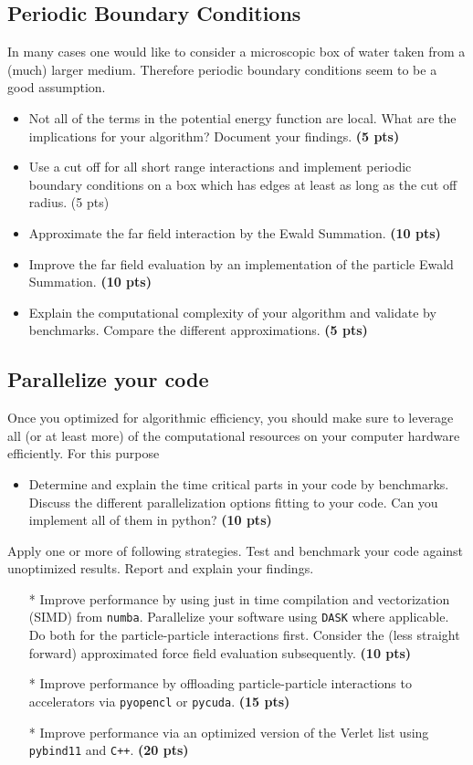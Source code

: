 \documentclass[a4paper,11pt]{amsart}
\begin{document}
\subsection{Periodic Boundary Conditions}
In many cases one would like to consider a microscopic box of water taken 
from a (much) larger medium. 
Therefore periodic boundary conditions seem to be a good assumption.
\begin{itemize}
  \item Not all of the terms in the potential energy function are local. 
  What are the implications for your algorithm? Document your findings. \textbf{(5 pts)}
  \item Use a cut off for all short range interactions and implement periodic 
  boundary conditions on a box which has edges at least as long as the cut off 
  radius. (5 pts)
  \item Approximate the far field interaction by the Ewald Summation. 
  \textbf{(10 pts)}
  \item Improve the far field evaluation by an implementation of the particle Ewald Summation. \textbf{(10 pts)}
  \item Explain the computational complexity of your algorithm and validate by 
  benchmarks. Compare the different approximations. \textbf{(5 pts)}
\end{itemize}
\subsection{Parallelize your code}
  Once you optimized for algorithmic efficiency, you should make sure to leverage 
  all (or at least more) of the computational resources on your computer hardware efficiently. 
  For this purpose
  \begin{itemize}
    \item Determine and explain the time critical parts in your code by benchmarks. 
    Discuss the different parallelization options fitting to your code. Can you implement all of them in python? \textbf{(10 pts)}
  \end{itemize}
  Apply one or more of following strategies. Test and benchmark your code against unoptimized results. Report and explain your findings.
  \begin{itemize}
      \item[*] Improve performance by using just in time compilation and vectorization (SIMD) from \texttt{numba}.
      Parallelize your software using \texttt{DASK} where applicable. 
      Do both for the particle-particle interactions first. Consider the (less straight forward) approximated force field evaluation subsequently. \textbf{(10 pts)}
      \item[*]	Improve performance by offloading particle-particle interactions to accelerators via \texttt{pyopencl} or \texttt{pycuda}. \textbf{(15 pts)}
      \item[*] Improve performance via an optimized version of the Verlet list  using \texttt{pybind11} and \texttt{C++}. \textbf{(20 pts)}
  \end{itemize}


\end{document}
